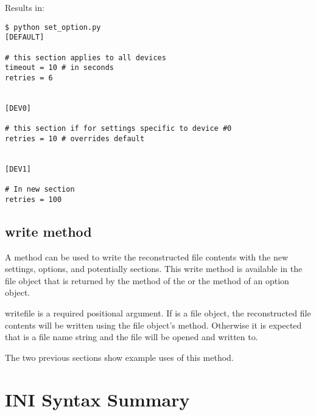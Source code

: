 \documentclass{howto}
\begin{document}
Results in:
\begin{verbatim}
$ python set_option.py
[DEFAULT]

# this section applies to all devices
timeout = 10 # in seconds
retries = 6


[DEV0]

# this section if for settings specific to device #0
retries = 10 # overrides default


[DEV1]

# In new section
retries = 100
\end{verbatim}

\subsection{write method\label{cfgparse-round-trip-write}}

A  method can be used to write the reconstructed file contents
with the new settings, options, and potentially sections.  This write method
is available in the file object that is returned by the  
method of the  or the  method of an option 
object.
  
  \begin{funcdesc}{write}{file}
     is a required positional argument.  If  is a file 
        object, the reconstructed file contents will be written using the 
        file object's  method.  Otherwise it is expected that 
         is a file name string and the file will be opened and 
        written to.
  \end{funcdesc}

The two previous sections show example uses of this method.

\section{INI Syntax Summary}

\end{document}
